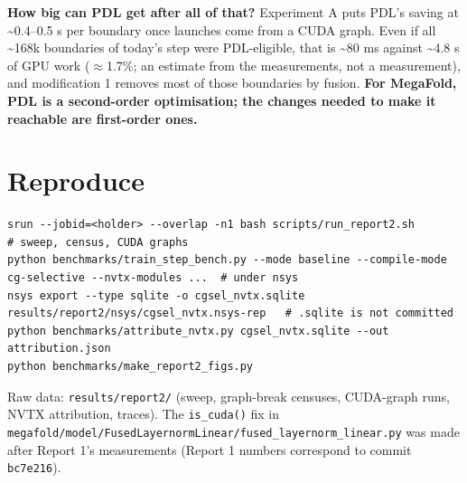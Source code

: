 \documentclass[10pt]{article}
\begin{document}
\textbf{How big can PDL get after all of that?} Experiment A puts PDL's saving at \textasciitilde{}0.4--0.5 \textmu{}s per boundary once launches come from a CUDA graph. Even if all \textasciitilde{}168k boundaries of today's step were PDL-eligible, that is \textasciitilde{}80 ms against \textasciitilde{}4.8 s of GPU work ($\approx$1.7\%; an estimate from the measurements, not a measurement), and modification 1 removes most of those boundaries by fusion. \textbf{For MegaFold, PDL is a second-order optimisation; the changes needed to make it reachable are first-order ones.}


\section{Reproduce}

\begin{lstlisting}
srun --jobid=<holder> --overlap -n1 bash scripts/run_report2.sh              # sweep, census, CUDA graphs
python benchmarks/train_step_bench.py --mode baseline --compile-mode cg-selective --nvtx-modules ...  # under nsys
nsys export --type sqlite -o cgsel_nvtx.sqlite results/report2/nsys/cgsel_nvtx.nsys-rep   # .sqlite is not committed
python benchmarks/attribute_nvtx.py cgsel_nvtx.sqlite --out attribution.json
python benchmarks/make_report2_figs.py
\end{lstlisting}
Raw data: \texttt{results/report2/} (sweep, graph-break censuses, CUDA-graph runs, NVTX attribution, traces). The \texttt{is\_cuda()} fix in \texttt{megafold/model/FusedLayernormLinear/fused\_layernorm\_linear.py} was made after Report 1's measurements (Report 1 numbers correspond to commit \texttt{bc7e216}).
\end{document}
